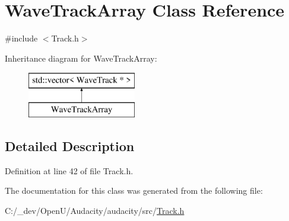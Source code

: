 \hypertarget{class_wave_track_array}{}\section{Wave\+Track\+Array Class Reference}
\label{class_wave_track_array}


{\ttfamily \#include $<$Track.\+h$>$}

Inheritance diagram for Wave\+Track\+Array\+:\begin{figure}[H]
\begin{center}
\leavevmode
\includegraphics[height=2.000000cm]{class_wave_track_array}
\end{center}
\end{figure}


\subsection{Detailed Description}


Definition at line 42 of file Track.\+h.



The documentation for this class was generated from the following file\+:\begin{DoxyCompactItemize}
\item 
C\+:/\+\_\+dev/\+Open\+U/\+Audacity/audacity/src/\hyperlink{src_2track_8h}{Track.\+h}\end{DoxyCompactItemize}
